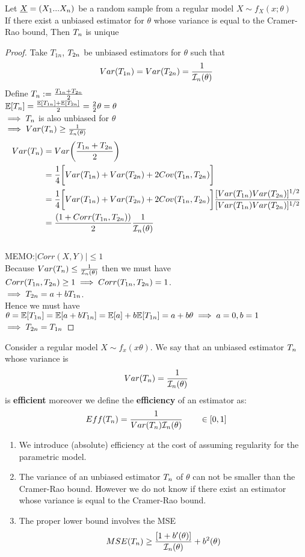 \begin{corol}
	Let $\underline X=(X_1... X_n)$ be a random sample from a regular model $X\sim f_X(x;\theta)$\\
	If there exist a unbiased estimator for $\theta$ whose variance is equal to the Cramer-Rao bound, Then $T_{n}$ is unique
\end{corol}
\begin{proof}
	Take $T_{1n}$, $T_{2n}$ be unbiased estimators for $\theta$ such that
	\[
	Var(T_{1n})=Var(T_{2n})=\frac{1}{\mathcal{I}_n(\theta)}
	\]
	Define $T_{n} := \frac{T_{1n} + T_{2n}}{2}$\\
	$\mathbb{E}[T_{n}]=\frac{\mathbb{E}[T_{1n}]+\mathbb{E}[T_{2n}]}{2}=\frac{2}{2}\theta=\theta$\\
	$\implies T_{n}$ is also unbiased for $\theta$\\
	$\implies Var(T_{n})\geq \frac{1}{\mathcal{I}_n(\theta)}$
	\[
	\begin{split}
	Var(T_{n})
	&=Var\bigg( \frac{T_{1n} + T_{2n}}{2}  \bigg)\\
	&=\frac{1}{4}\bigg[ Var(T_{1n})+ Var(T_{2n}) +2 Cov(T_{1n}, T_{2n}) \bigg]\\
	&=\frac{1}{4 }\bigg[ Var(T_{1n})+ Var(T_{2n}) +2 Cov(T_{1n}, T_{2n}) \bigg]\frac{[Var(T_{1n})Var(T_{2n})]^{1/2}}{[Var(T_{1n})Var(T_{2n})]^{1/2}}\\
	&=\frac{(1+Corr(T_{1n},T_{2n}))}{2}\frac{1}{\mathcal{I}_n(\theta)}
	\end{split}
	\]
	\\MEMO:$|Corr(X,Y)|\leq 1$\\
	Because $Var(T_{n})\leq\frac{1}{\mathcal{I}_n(\theta)}$ then we must have  $Corr(T_{1n},T_{2n})\geq 1 \implies Corr(T_{1n},T_{2n})= 1$.\\
	$\implies T_{2n}=a+bT_{1n}$.\\
	Hence we must have $\theta=\mathbb{E}[T_{1n}]=\mathbb{E}[a+bT_{1n}]=\mathbb{E}[a]+b\mathbb{E}[T_{1n}]=a+b\theta\implies a=0,b=1$\\
	$\implies T_{2n}=T_{1n}$
\end{proof}
\begin{defi}
	Consider a regular model $X\sim f_x(x\theta)$. We say that an unbiased estimator $T_{n}$ whose variance is 
	\[
	Var(T_{n})=\frac{1}{\mathcal{I}_n(\theta)}
	\]
	is \textbf{efficient} moreover we define the \textbf{efficiency} of an estimator as:
	\[
	Eff(T_{n})=\frac{1}{Var(T_{n})\mathcal{I}_n(\theta)} \ \ \ \ \ \ \in [0,1]
	\]
\end{defi}
\begin{oss}
	\begin{enumerate}
		\item We introduce (absolute) efficiency at the cost of assuming regularity for the parametric model.
		\item The variance of an unbiased estimator $T_{n}$ of $\theta$ can not be smaller than the Cramer-Rao bound. However we do not know if there exist an estimator whose variance is equal to the Cramer-Rao bound.
		\item The proper lower bound involves the MSE
		$$MSE(T_{n})\geq\frac{[1+b'(\theta)]}{\mathcal{I}_n(\theta)}+b^2(\theta)$$ 
\end{enumerate}
\end{oss}
